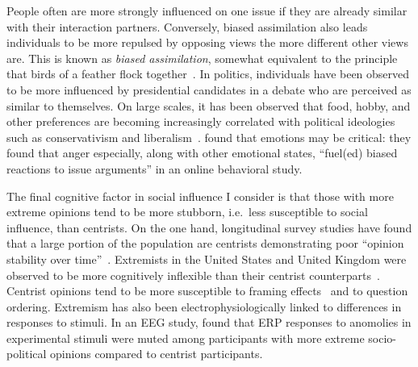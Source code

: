 \documentclass[12pt,letterpaper]{article}
\begin{document}
People often are more strongly influenced on one issue if they are already
similar with their interaction partners. Conversely, biased assimilation
also leads individuals to be more repulsed by opposing views the more 
different other views are. This is
known as \emph{biased assimilation}, somewhat equivalent to 
the principle that birds of a feather flock together~\cite{Lord1979,McPherson2001}.
In politics, individuals have been observed to be more influenced by presidential
candidates in a debate who are perceived as similar to themselves.
On large scales, it has been observed that food, hobby, and other
preferences are becoming increasingly correlated with political ideologies such
as conservativism and liberalism~\cite{DellaPosta2015}.
 found that emotions may be critical: they found that
anger especially, along with other emotional states, ``fuel(ed) biased reactions
to issue arguments'' in an online behavioral study. 

The final cognitive factor in social influence I consider is that those with
more extreme opinions tend to be more stubborn, i.e.\ less susceptible to
social influence, than centrists. On the one hand, longitudinal survey studies
have found that a large portion of the population are centrists demonstrating
poor ``opinion stability over time''~\cite{Converse1964,Zaller1992,Kinder2017}. 
Extremists in the United States and United Kingdom were observed to be 
more cognitively inflexible than their centrist counterparts~\cite{Zmigrod2019a}.
Centrist opinions tend to be more susceptible to framing effects~\cite{Chong2007}
and to question ordering. Extremism has also been electrophysiologically linked
to differences in responses to stimuli. In an EEG study,  found that ERP
responses to anomolies in experimental stimuli were muted among participants
with more extreme socio-political opinions compared to centrist participants.
\end{document}
